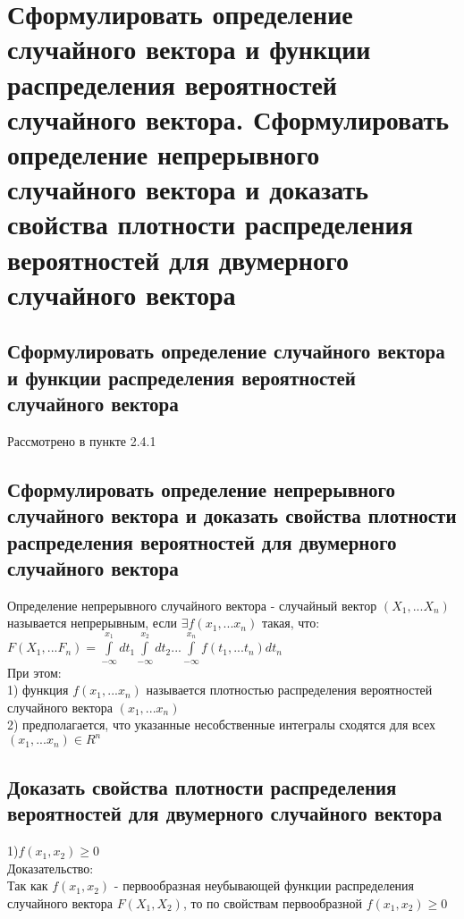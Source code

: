 \section{Сформулировать определение случайного вектора и функции распределения вероятностей случайного вектора. Сформулировать определение непрерывного случайного вектора и доказать свойства плотности распределения вероятностей для двумерного случайного вектора}

\subsection{Сформулировать определение случайного вектора и функции распределения вероятностей случайного вектора}
Рассмотрено в пункте 2.4.1

\subsection{Сформулировать определение непрерывного случайного вектора и доказать свойства плотности распределения вероятностей для двумерного случайного вектора}
Определение непрерывного случайного вектора - случайный вектор $(X_{1}, ... X_{n})$ называется непрерывным, если $\exists f(x_{1}, ... x_{n})$ такая, что:\\
$F(X_{1}, ... F_{n}) = \int\limits^{x_{1}}_{-\infty} dt_{1} \int\limits^{x_{2}}_{-\infty} dt_{2} ... \int\limits^{x_{n}}_{-\infty} f(t_{1}, ... t_{n}) dt_{n}$\\

При этом:\\
1) функция $f(x_{1}, ... x_{n})$ называется плотностью распределения вероятностей случайного вектора $(x_{1}, ... x_{n})$\\
2) предполагается, что указанные несобственные интегралы сходятся для всех $(x_{1}, ... x_{n}) \in R^{n}$\\

\subsection{Доказать свойства плотности распределения вероятностей для двумерного случайного вектора}
1)$f(x_{1}, x_{2}) \geqslant 0$\\

Доказательство:\\
Так как $f(x_{1}, x_{2})$ - первообразная неубывающей функции распределения случайного вектора $F(X_{1}, X_{2})$, то по свойствам первообразной $f(x_{1}, x_{2}) \geqslant 0$\\

